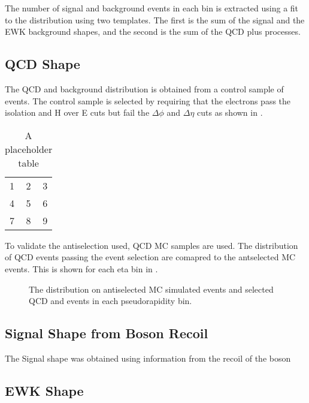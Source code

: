 The number of signal and background events in each bin is extracted using a fit
to the \ETm distribution using two templates.
The first is the sum of the \Wenu signal and the \ac{EWK} background shapes,
and the second is the sum of the \ac{QCD} plus \gjet processes.

\subsection{\ac{QCD} \ETm Shape}

The \ac{QCD} and \gjet background distribution is obtained from a control sample of
events. The control sample is selected by requiring that the electrons pass the
isolation and H over E cuts but fail the $\Delta\phi$ and $\Delta\eta$ cuts as
shown in .

\begin{table}[htb]
  \centering
  \begin{tabular}{| l c r |}
    \hline
    1 & 2 & 3 \\
    4 & 5 & 6 \\
    7 & 8 & 9 \\
  \hline
  \end{tabular}
  \caption{A placeholder table}
  \label{asym36:antisel}
\end{table}

To validate the antiselection used, \ac{QCD} \ac{MC} samples are used. The
distribution of \ac{QCD} events passing the event selection are comapred to the
antselected MC events. This is shown for each eta bin in
.

\begin{figure}[htb]
  \centering
  \caption{The \ETm distribution on antiselected \ac{MC} simulated events
  and selected \ac{QCD} and \gjet events in each pseudorapidity bin.}
  \label{asym36:antiselclosure}
\end{figure}

\subsection{Signal \ETm Shape from Boson Recoil}

The Signal \ETm shape was obtained using information from the recoil of the
boson

\subsection{\ac{EWK} \ETm Shape}

